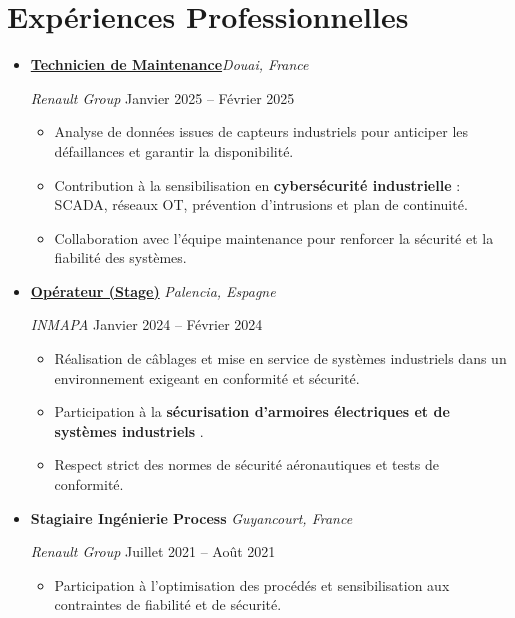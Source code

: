 \documentclass[a4paper,10pt]{article}
\begin{document}
\section*{Expériences Professionnelles}



\begin{itemize}[leftmargin=*]

  \item
  \textbf{\href{https://www.renaultgroup.com/}{Technicien de Maintenance}}\hfill \emph{Douai, France} \
  
  \emph{Renault Group} \hfill Janvier 2025 – Février 2025 \
  \begin{itemize}
     \item Analyse de données issues de capteurs industriels pour anticiper les défaillances et garantir la disponibilité.  
    \item Contribution à la sensibilisation en \textbf{cybersécurité industrielle} : SCADA, réseaux OT, prévention d’intrusions et plan de continuité.  
    \item Collaboration avec l’équipe maintenance pour renforcer la sécurité et la fiabilité des systèmes.    
  \end{itemize}

  \item
  \textbf{\href{https://www.inmapa.com/en/}{Opérateur (Stage)}} \hfill \emph{Palencia, Espagne} \
  
  \emph{INMAPA} \hfill Janvier 2024 – Février 2024 \
  \begin{itemize}
    \item Réalisation de câblages et mise en service de systèmes industriels dans un environnement exigeant en conformité et sécurité.  
    \item Participation à la \textbf{sécurisation d’armoires électriques et de systèmes industriels }.  
    \item Respect strict des normes de sécurité aéronautiques et tests de conformité.  
 
  \end{itemize}

  \item
  \textbf{Stagiaire Ingénierie Process} \hfill \emph{Guyancourt, France} \

  \emph{Renault Group} \hfill Juillet 2021 – Août 2021 \
  \begin{itemize}
     
    \item Participation à l’optimisation des procédés et sensibilisation aux contraintes de fiabilité et de sécurité.  
    
  \end{itemize}

\end{itemize}
\end{document}
